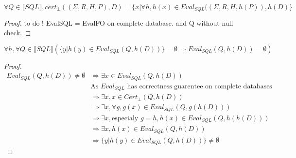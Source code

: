 \begin{myprop}
	$$\forall Q \in \llbracket SQL \rrbracket, cert_\bot((\Sigma,R,H,P),D) = \{x|\forall h, h(x)\in Eval_{SQL}((\Sigma,R,H,h(P)),h(D) \}$$
\end{myprop}

\begin{proof}
	to do ! EvalSQL = EvalFO on complete database. and Q without null check.
\end{proof}

\begin{myprop}
	$$\forall h,\forall Q \in  \llbracket SQL \rrbracket (\{y|h(y) \in Eval_{SQL}(Q,h(D))\} = \emptyset \Rightarrow Eval_{SQL}(Q,h(D)) = \emptyset)$$
\end{myprop}

\begin{proof}
	\begin{align*}
	Eval_{SQL}(Q,h(D)) \neq \emptyset & \Rightarrow   \exists x \in Eval_{SQL}(Q,h(D))
	\\& \mbox{As } Eval_{SQL} \mbox{ has correctness guarentee on complete databases}
	\\& \Rightarrow  \exists x, x \in Cert_{\bot}(Q,h(D))
	\\& \Rightarrow  \exists x, \forall g, g(x) \in Eval_{SQL}(Q,g(h(D)))
	\\& \Rightarrow  \exists x, \mbox{especialy } g=h, h(x) \in Eval_{SQL}(Q,h(h(D)))
	\\& \Rightarrow \exists x, h(x) \in Eval_{SQL}(Q,h(D))
	\\& \Rightarrow \{y|h(y) \in Eval_{SQL}(Q,h(D))\} \neq \emptyset
	\end{align*}
\end{proof}

